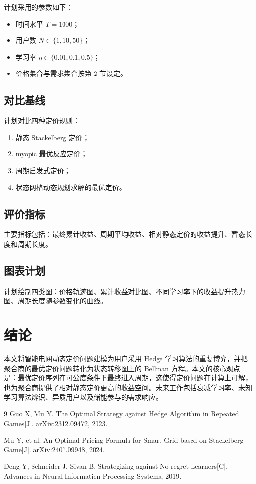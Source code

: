\documentclass[UTF8]{ctexart}
\begin{document}
计划采用的参数如下：
\begin{itemize}
    \item 时间水平 $T = 1000$；
    \item 用户数 $N \in \{1, 10, 50\}$；
    \item 学习率 $\eta \in \{0.01, 0.1, 0.5\}$；
    \item 价格集合与需求集合按第 2 节设定。
\end{itemize}

\subsection{对比基线}

计划对比四种定价规则：
\begin{enumerate}
    \item 静态 Stackelberg 定价；
    \item myopic 最优反应定价；
    \item 周期启发式定价；
    \item 状态网格动态规划求解的最优定价。
\end{enumerate}

\subsection{评价指标}

主要指标包括：最终累计收益、周期平均收益、相对静态定价的收益提升、暂态长度和周期长度。

\subsection{图表计划}

计划绘制四类图：价格轨迹图、累计收益对比图、不同学习率下的收益提升热力图、周期长度随参数变化的曲线。

\section{结论}

本文将智能电网动态定价问题建模为用户采用 Hedge 学习算法的重复博弈，并把聚合商的最优定价问题转化为状态转移图上的 Bellman 方程。本文的核心观点是：最优定价序列在可公度条件下最终进入周期，这使得定价问题在计算上可解，也为聚合商提供了相对静态定价更高的收益空间。未来工作包括衰减学习率、未知学习算法辨识、异质用户以及储能参与的需求响应。

\begin{thebibliography}{9}
Guo X, Mu Y. The Optimal Strategy against Hedge Algorithm in Repeated Games[J]. arXiv:2312.09472, 2023.

Mu Y, et al. An Optimal Pricing Formula for Smart Grid based on Stackelberg Game[J]. arXiv:2407.09948, 2024.

Deng Y, Schneider J, Sivan B. Strategizing against No-regret Learners[C]. Advances in Neural Information Processing Systems, 2019.
\end{thebibliography}
\end{document}
